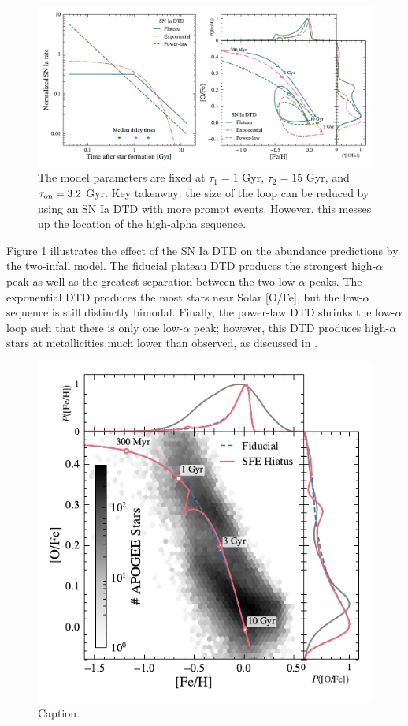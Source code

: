 \documentclass[twocolumn,twocolappendix,linenumbers]{aastex631}
\begin{document}
\begin{figure}
    \centering
    \includegraphics{figures/delay_time_distribution.pdf}
    \caption{The model parameters are fixed at $\tau_1=1$ Gyr, $\tau_2=15$ Gyr, and $\tau_{\rm on}=3.2$ Gyr. Key takeaway: the size of the loop can be reduced by using an SN Ia DTD with more prompt events. However, this messes up the location of the high-alpha sequence.}
    \label{fig:dtd}
\end{figure}

Figure \ref{fig:dtd} illustrates the effect of the SN Ia DTD on the abundance predictions by the two-infall model. The fiducial plateau DTD produces the strongest high-$\alpha$ peak as well as the greatest separation between the two low-$\alpha$ peaks. The exponential DTD produces the most stars near Solar [O/Fe], but the low-$\alpha$ sequence is still distinctly bimodal. Finally, the power-law DTD shrinks the low-$\alpha$ loop such that there is only one low-$\alpha$ peak; however, this DTD produces high-$\alpha$ stars at metallicities much lower than observed, as discussed in \citet{dubay_galactic_2024}.

\begin{figure}
    \centering
    \includegraphics{figures/onezone_sfe_hiatus.pdf}
    \caption{Caption.}
    \label{fig:onezone-sfe-hiatus}
\end{figure}
\end{document}
